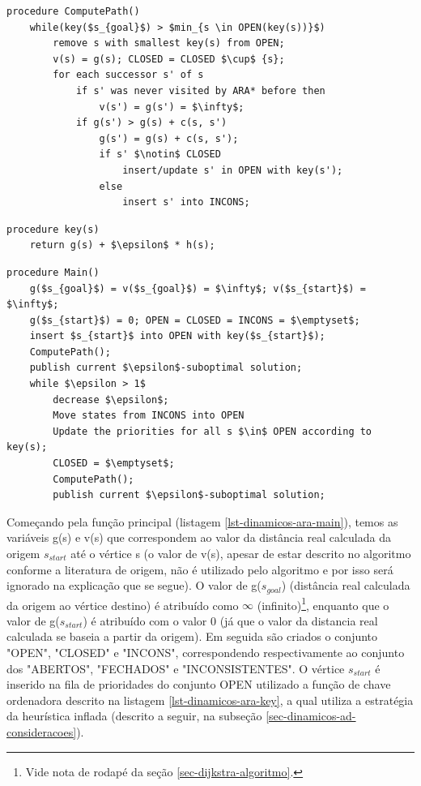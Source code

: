 \begin{lstlisting}[mathescape, label=lst-dinamicos-ara-computepath, caption=Algoritmo ARA* - função de cálculo de caminho, float=htpb]
procedure ComputePath()
	while(key($s_{goal}$) > $min_{s \in OPEN(key(s))}$)
		remove s with smallest key(s) from OPEN;
		v(s) = g(s); CLOSED = CLOSED $\cup$ {s};
		for each successor s' of s
			if s' was never visited by ARA* before then
				v(s') = g(s') = $\infty$;
			if g(s') > g(s) + c(s, s')
				g(s') = g(s) + c(s, s');
				if s' $\notin$ CLOSED
					insert/update s' in OPEN with key(s');
				else
					insert s' into INCONS;
\end{lstlisting}

 
\begin{lstlisting}[mathescape, label=lst-dinamicos-ara-key, caption=Algoritmo ARA* - função da chave ordenadora da fila de prioridades, float=htpb]
procedure key(s)
	return g(s) + $\epsilon$ * h(s);
\end{lstlisting}

\begin{lstlisting}[mathescape, label=lst-dinamicos-ara-main, caption=Algoritmo ARA* - função principal, float=htpb]
procedure Main()
	g($s_{goal}$) = v($s_{goal}$) = $\infty$; v($s_{start}$) = $\infty$;
	g($s_{start}$) = 0; OPEN = CLOSED = INCONS = $\emptyset$;
	insert $s_{start}$ into OPEN with key($s_{start}$);
	ComputePath();
	publish current $\epsilon$-suboptimal solution;
	while $\epsilon > 1$
		decrease $\epsilon$;
		Move states from INCONS into OPEN
		Update the priorities for all s $\in$ OPEN according to key(s);
		CLOSED = $\emptyset$;
		ComputePath();
		publish current $\epsilon$-suboptimal solution;
\end{lstlisting}

Começando pela função principal (listagem \ref{lst-dinamicos-ara-main}), temos as variáveis g(s) e v(s) que correspondem ao valor da distância real calculada da origem $s_{start}$ até o vértice s (o valor de v(s), apesar de estar descrito no algoritmo conforme a literatura de origem, não é utilizado pelo algoritmo e por isso será ignorado na explicação que se segue). O valor de g($s_{goal}$) (distância real calculada da origem ao vértice destino) é atribuído como $\infty$ (infinito)\footnote{Vide nota de rodapé da seção \ref{sec-dijkstra-algoritmo}.}, enquanto que o valor de g($s_{start}$) é atribuído com o valor 0 (já que o valor da distancia real calculada se baseia a partir da origem). Em seguida são criados o conjunto "OPEN", "CLOSED" e "INCONS", correspondendo respectivamente ao conjunto dos "ABERTOS", "FECHADOS" e "INCONSISTENTES". O vértice $s_{start}$ é inserido na fila de prioridades do conjunto OPEN utilizado a função de chave ordenadora descrito na listagem \ref{lst-dinamicos-ara-key}, a qual utiliza a estratégia da heurística inflada (descrito a seguir, na subseção \ref{sec-dinamicos-ad-consideracoes}).

